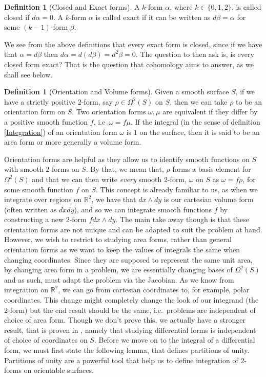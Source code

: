 \documentclass[11pt]{report}
\theoremstyle{definition}
\newtheorem{defn}[thm]{Definition}
\begin{document}
\begin{defn}[Closed and Exact forms]
  A $k$-form $\alpha$, where $k \in \{0,1,2\}$, is called closed if $d\alpha = 0$. A $k$-form $\alpha$ is called exact if it can be written as $d\beta = \alpha$ for some $(k-1)$-form $\beta$.
\end{defn}
We see from the above definitions that every exact form is closed, since if we have that $\alpha = d\beta $ then $d\alpha = d(d\beta) = d^2\beta = 0$. The question to then ask is, is every closed form exact? That is the question that cohomology aims to answer, as we shall see below.
\begin{defn}[Orientation and Volume forms]\label{volumeform}
  Given a smooth surface $S$, if we have a strictly positive $2$-form, say $\rho \in \Omega^2(S)$ on $S$, then we can take $\rho$ to be an orientation form on $S$. Two orientation forms $\omega, \mu$ are equivalent if they differ by a positive smooth function $f$, i.e\ $\omega = f\mu$. If the integral (in the sense of definition \ref{Integration}) of an orientation form $\omega$ is $1$ on the surface, then it is said to be an area form or more generally a volume form.
\end{defn}
Orientation forms are helpful as they allow us to identify smooth functions on $S$ with smooth $2$-forms on $S$. By that, we mean that, $\rho$ forms a basis element for $\Omega^2(S)$ and that we can then write \emph{every} smooth $2$-form, $\omega$ on $S$ as $\omega = f\rho$, for some smooth function $f$ on $S$. This concept is already familiar to us, as when we integrate over regions on $\mathbb{R}^2$, we have that $dx\wedge dy$ is our cartesian volume form (often written as $dxdy$), and so we can integrate smooth functions $f$ by constructing a new $2$-form $fdx\wedge dy$. The main take away though is that these orientation forms are not unique and can be adapted to suit the problem at hand. However, we wish to restrict to studying area forms, rather than general orientation forms as we want to keep the values of integrals the same when changing coordinates. Since they are supposed to represent the same unit area, by changing area form in a problem, we are essentially changing bases of $\Omega^2(S)$ and as such, must adapt the problem via the Jacobian. As we know from integration on $\mathbb{R}^2$, we can go from cartesian coordinates to, for example, polar coordinates. This change might completely change the look of our integrand (the $2$-form) but the end result should be the same, i.e.\ problems are independent of choice of area form. Though we don't prove this, we actually have a stronger result, that is proven in \cite{calcohomo}, namely that studying differential forms is independent of choice of coordinates on $S$. Before we move on to the integral of a differential form, we must first state the following lemma, that defines partitions of unity. Partitions of unity are a powerful tool that help us to define integration of $2$-forms on orientable surfaces.
\end{document}
